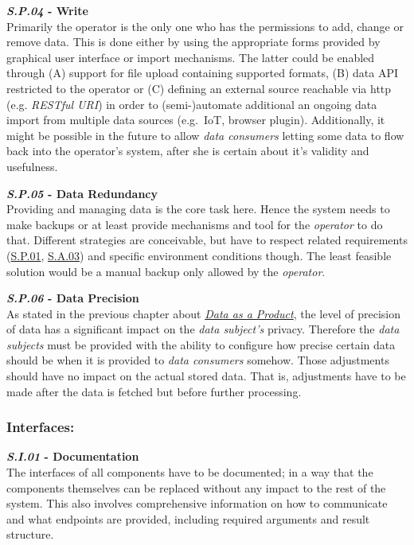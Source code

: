 \documentclass[12pt,english,a4paper,titlepage,cleardoublepage=empty,dottedtoc]{report}
\begin{document}
\textbf{\emph{\protect\hypertarget{sp04}{}{S.P.04}} - Write}\\
Primarily the operator is the only one who has the permissions to add,
change or remove data. This is done either by using the appropriate
forms provided by graphical user interface or import mechanisms. The
latter could be enabled through (A) support for file upload containing
supported formats, (B) data API restricted to the operator or (C)
defining an external source reachable via http (e.g. \emph{RESTful URI})
in order to (semi-)automate additional an ongoing data import from
multiple data sources (e.g.~IoT, browser plugin). Additionally, it might
be possible in the future to allow \emph{data consumers} letting some
data to flow back into the operator's system, after she is certain about
it's validity and usefulness.

\textbf{\emph{\protect\hypertarget{sp05}{}{S.P.05}} - Data Redundancy}\\
Providing and managing data is the core task here. Hence the system
needs to make backups or at least provide mechanisms and tool for the
\emph{operator} to do that. Different strategies are conceivable, but
have to respect related requirements (\protect\hyperlink{sp01}{S.P.01},
\protect\hyperlink{sa03}{S.A.03}) and specific environment conditions
though. The least feasible solution would be a manual backup only
allowed by the \emph{operator}.

\textbf{\emph{\protect\hypertarget{sp06}{}{S.P.06}} - Data Precision}\\
As stated in the previous chapter about
\emph{\protect\hyperlink{personal-data-as-a-product}{Data as a
Product}}, the level of precision of data has a significant impact on
the \emph{data subject's} privacy. Therefore the \emph{data subjects}
must be provided with the ability to configure how precise certain data
should be when it is provided to \emph{data consumers} somehow. Those
adjustments should have no impact on the actual stored data. That is,
adjustments have to be made after the data is fetched but before further
processing.

\subsubsection{Interfaces:}\label{interfaces}

\textbf{\emph{\protect\hypertarget{si01}{}{S.I.01}} - Documentation}\\
The interfaces of all components have to be documented; in a way that
the components themselves can be replaced without any impact to the rest
of the system. This also involves comprehensive information on how to
communicate and what endpoints are provided, including required
arguments and result structure.
\end{document}
